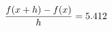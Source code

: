 \documentclass[preview]{standalone}
\begin{document}
\begin{align*}
\special{dvisvgm:raw <g id='unique000'>}\frac{f(x+h)-f(x)}{h} = 5.412\special{dvisvgm:raw </g>}
\end{align*}
\end{document}
